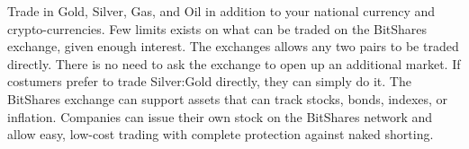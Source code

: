 Trade in Gold, Silver, Gas, and Oil in addition to your national currency and
crypto-currencies. Few limits exists on what can be traded on the BitShares
exchange, given enough interest. The exchanges allows any two pairs to be
traded directly. There is no need to ask the exchange to open up an additional
market. If costumers prefer to trade Silver:Gold directly, they can simply do
it. The BitShares exchange can support assets that can track stocks, bonds,
indexes, or inflation. Companies can issue their own stock on the BitShares
network and allow easy, low-cost trading with complete protection against naked
shorting.
